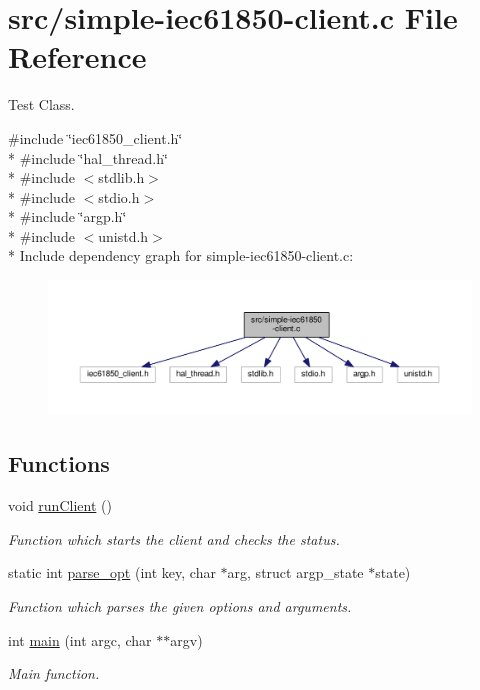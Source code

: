 \hypertarget{simple-iec61850-client_8c}{}\section{src/simple-\/iec61850-\/client.c File Reference}
\label{simple-iec61850-client_8c}


Test Class.  


{\ttfamily \#include \char`\"{}iec61850\+\_\+client.\+h\char`\"{}}\\*
{\ttfamily \#include \char`\"{}hal\+\_\+thread.\+h\char`\"{}}\\*
{\ttfamily \#include $<$stdlib.\+h$>$}\\*
{\ttfamily \#include $<$stdio.\+h$>$}\\*
{\ttfamily \#include \char`\"{}argp.\+h\char`\"{}}\\*
{\ttfamily \#include $<$unistd.\+h$>$}\\*
Include dependency graph for simple-\/iec61850-\/client.c\+:
\nopagebreak
\begin{figure}[H]
\begin{center}
\leavevmode
\includegraphics[width=350pt]{simple-iec61850-client_8c__incl}
\end{center}
\end{figure}
\subsection*{Functions}
\begin{DoxyCompactItemize}
\item 
void \hyperlink{simple-iec61850-client_8c_a19c4ac63742805a0bfd8fc4a512b42d3}{run\+Client} ()
\begin{DoxyCompactList}\small\item\em Function which starts the client and checks the status. \end{DoxyCompactList}\item 
static int \hyperlink{simple-iec61850-client_8c_aaf7bc24f3891f0c63a6043f4dc2ab311}{parse\+\_\+opt} (int key, char $\ast$arg, struct argp\+\_\+state $\ast$state)
\begin{DoxyCompactList}\small\item\em Function which parses the given options and arguments. \end{DoxyCompactList}\item 
int \hyperlink{simple-iec61850-client_8c_a3c04138a5bfe5d72780bb7e82a18e627}{main} (int argc, char $\ast$$\ast$argv)
\begin{DoxyCompactList}\small\item\em Main function. \end{DoxyCompactList}\end{DoxyCompactItemize}
